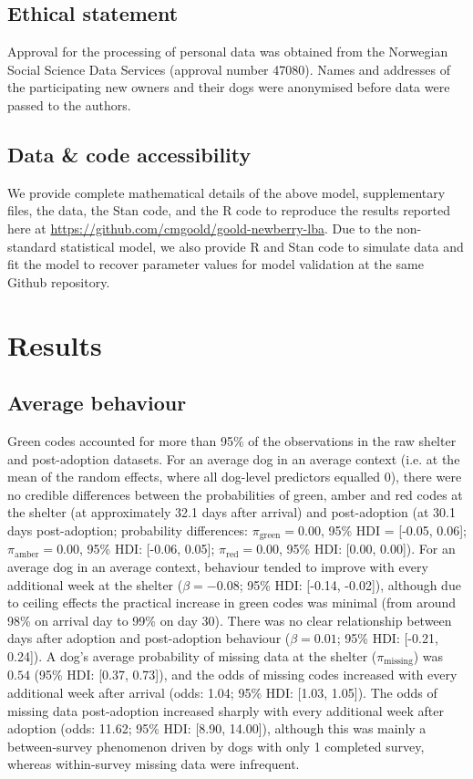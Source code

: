 \documentclass[fleqn,10pt]{wlscirep}
\begin{document}
\subsection*{Ethical statement}
Approval for the processing of personal data was obtained from the Norwegian Social Science Data Services (approval number 47080). Names and addresses of the participating new owners and their dogs were anonymised before data were passed to the authors.

\subsection*{Data \& code accessibility}
We provide complete mathematical details of the above model, supplementary files, the data, the Stan code, and the R code to reproduce the results reported here at \url{https://github.com/cmgoold/goold-newberry-lba}. Due to the non-standard statistical model, we also provide R and Stan code to simulate data and fit the model to recover parameter values for model validation at the same Github repository.

\section*{Results}

\subsection*{Average behaviour}
Green codes accounted for more than 95\% of the observations in the raw shelter and post-adoption datasets. For an average dog in an average context (i.e. at the mean of the random effects, where all dog-level predictors equalled 0), there were no credible differences between the probabilities of green, amber and red codes at the shelter (at approximately 32.1 days after arrival) and post-adoption (at 30.1 days post-adoption; probability differences: $\pi_{\text{green}} = 0.00$, 95\% HDI = [-0.05, 0.06]; $\pi_{\text{amber}} = 0.00$, 95\% HDI: [-0.06, 0.05]; $\pi_{\text{red}} = 0.00$, 95\% HDI: [0.00, 0.00]). For an average dog in an average context, behaviour tended to improve with every additional week at the shelter ($\beta = -0.08$; 95\% HDI: [-0.14, -0.02]), although due to ceiling effects the practical increase in green codes was minimal (from around 98\% on arrival day to 99\% on day 30). There was no clear relationship between days after adoption and post-adoption behaviour ($\beta = 0.01$; 95\% HDI: [-0.21, 0.24]). A dog's average probability of missing data at the shelter ($\pi_{\text{missing}}$) was $0.54$ (95\% HDI: [0.37, 0.73]), and the odds of missing codes increased with every additional week after arrival (odds: 1.04; 95\% HDI: [1.03, 1.05]). The odds of missing data post-adoption increased sharply with every additional week after adoption (odds: 11.62; 95\% HDI: [8.90, 14.00]), although this was mainly a between-survey phenomenon driven by dogs with only 1 completed survey, whereas within-survey missing data were infrequent.
\end{document}

